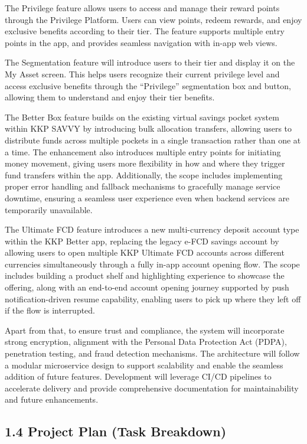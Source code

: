The Privilege feature allows users to access and manage their reward
points through the Privilege Platform. Users can view points, redeem
rewards, and enjoy exclusive benefits according to their tier. The
feature supports multiple entry points in the app, and provides seamless
navigation with in-app web views.

The Segmentation feature will introduce users to their tier and display
it on the My Asset screen. This helps users recognize their current
privilege level and access exclusive benefits through the ``Privilege''
segmentation box and button, allowing them to understand and enjoy their
tier benefits.

The Better Box feature builds on the existing virtual savings pocket
system within KKP SAVVY by introducing bulk allocation transfers,
allowing users to distribute funds across multiple pockets in a single
transaction rather than one at a time. The enhancement also introduces
multiple entry points for initiating money movement, giving users more
flexibility in how and where they trigger fund transfers within the app.
Additionally, the scope includes implementing proper error handling and
fallback mechanisms to gracefully manage service downtime, ensuring a
seamless user experience even when backend services are temporarily
unavailable.

The Ultimate FCD feature introduces a new multi-currency deposit account
type within the KKP Better app, replacing the legacy e-FCD savings
account by allowing users to open multiple KKP Ultimate FCD accounts
across different currencies simultaneously through a fully in-app
account opening flow. The scope includes building a product shelf and
highlighting experience to showcase the offering, along with an
end-to-end account opening journey supported by push notification-driven
resume capability, enabling users to pick up where they left off if the
flow is interrupted.

Apart from that, to ensure trust and compliance, the system will
incorporate strong encryption, alignment with the Personal Data
Protection Act (PDPA), penetration testing, and fraud detection
mechanisms. The architecture will follow a modular microservice design
to support scalability and enable the seamless addition of future
features. Development will leverage CI/CD pipelines to accelerate
delivery and provide comprehensive documentation for maintainability and
future enhancements.

\subsection{\texorpdfstring{\textbf{1.4 Project Plan (Task
Breakdown)}}{1.4 Project Plan (Task Breakdown)}}\label{project-plan-task-breakdown}

